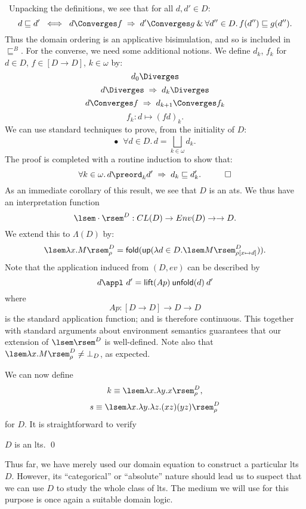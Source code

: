 \proof\ Unpacking the definitions, we see that for all $d, d' \in D$:
\[ d \sqsubseteq d' \;\; \Longleftrightarrow \;\; d \Converges f \; \Rightarrow \; d' \Converges g \: \& \: \forall d'' \in D . \, f(d'' ) \sqsubseteq g(d'' ) . \]
Thus the domain ordering is an applicative bisimulation, and so is included in $\sqsubseteq^{B}$. For the converse, we need some additional notions. We define $d_{k}$, $f_{k}$ for $d \in D$, $f \in [D \rightarrow D]$, $k \in \omega$ by:
\[ d_{0} \Diverges \]
\[ d \Diverges \; \Rightarrow \; d_{k} \Diverges \]
\[ d \Converges f \; \Rightarrow \; d_{k+1} \Converges f_{k} \]
\[ f_{k} : d \mapsto (f d)_{k} . \]
We can use standard techniques to prove, from the initiality of $D$:
\[ \bullet \;\; \forall d \in D . \, d = \bigsqcup_{k \in \omega} d_{k} . \]
The proof is completed with a routine induction to show that:
\[ \forall k \in \omega . \, d \preord_{k} d' \; \Rightarrow \; d_{k} \sqsubseteq d'_{k} . \;\;\; \qed \]
As an immediate corollary of this result, we see that $D$ is an ats. We thus have an interpretation function
\[ \lsem \cdot \rsem^{D} : CL(D) \rightarrow Env(D) \rightarrow \rightarrow D . \]
We extend this to $\Lambda (D)$ by:
\[ \lsem \lambda x . M \rsem^{D}_{\rho} = {\sf fold}({\sf up}(\lambda d \in D . \lsem M \rsem^{D}_{\rho [ x \mapsto d ]} )) . \]
Note that the application  induced from $(D, ev)$ can be described by
\[ d \appl\  d' = {\sf lift}(Ap) \: {\sf unfold}(d) \: d' \]
where
\[ Ap : [D \rightarrow D] \rightarrow D \rightarrow D \]
is the standard application function; and is therefore continuous. This together with standard arguments about environment semantics guarantees that our extension of $\lsem \rsem^{D}$ is well-defined. Note also that $\lsem \lambda x . M \rsem^{D}_{\rho} \neq \bot_{D}$, as expected.

We can now define
\[ k \equiv \lsem \lambda x . \lambda y . x \rsem^{D}_{\rho} , \]
\[ s \equiv \lsem \lambda x . \lambda y . \lambda z . (x z) (y z) \rsem^{D}_{\rho} \]
for $D$. It is straightforward to verify
\begin{proposition}
$D$ is an lts. \qed
\end{proposition}

Thus far, we have merely used our domain equation to construct a particular lts $D$. However, its ``categorical'' or ``absolute'' nature should lead us to suspect that we can use $D$ to study the whole class of lts. The medium we will use for this purpose is once again a suitable domain logic.
